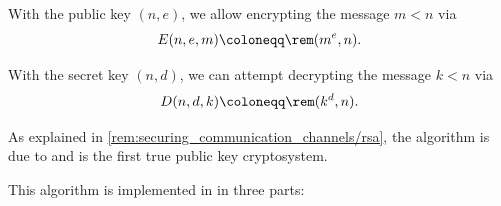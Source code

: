 \begin{algorithm}
\begin{thmenum}
     With the public key \( (n, e) \), we allow encrypting the message \( m < n \) via
    \begin{equation*}
      E(n, e, m) \coloneqq \rem(m^e, n).
    \end{equation*}

     With the secret key \( (n, d) \), we can attempt decrypting the message \( k < n \) via
    \begin{equation*}
      D(n, d, k) \coloneqq \rem(k^d, n).
    \end{equation*}
  \end{thmenum}
\end{algorithm}
\begin{comments}
  \item As explained in \cref{rem:securing_communication_channels/rsa}, the algorithm is due to \textcite{RivestShamirAdleman1978RSA} and is the first true public key cryptosystem.

  \item This algorithm is implemented in \cite{notebook:code} in three parts:
  \begin{CodeRefDisplay}
     \\
     \\
  \end{CodeRefDisplay}
\end{comments}
